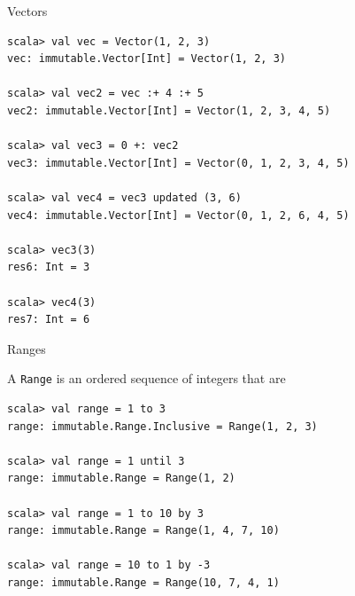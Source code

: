 \begin{frame}[fragile]{Vectors}
\begin{lstlisting}
scala> val vec = Vector(1, 2, 3)
vec: immutable.Vector[Int] = Vector(1, 2, 3)

scala> val vec2 = vec :+ 4 :+ 5
vec2: immutable.Vector[Int] = Vector(1, 2, 3, 4, 5)

scala> val vec3 = 0 +: vec2
vec3: immutable.Vector[Int] = Vector(0, 1, 2, 3, 4, 5)

scala> val vec4 = vec3 updated (3, 6)
vec4: immutable.Vector[Int] = Vector(0, 1, 2, 6, 4, 5)

scala> vec3(3)
res6: Int = 3

scala> vec4(3)
res7: Int = 6
\end{lstlisting}
\end{frame}

\begin{frame}[fragile]{Ranges}
\begin{center}
A \lstinline!Range! is an ordered sequence of integers that are 
\end{center}
\begin{lstlisting}
scala> val range = 1 to 3
range: immutable.Range.Inclusive = Range(1, 2, 3)

scala> val range = 1 until 3
range: immutable.Range = Range(1, 2)

scala> val range = 1 to 10 by 3
range: immutable.Range = Range(1, 4, 7, 10)

scala> val range = 10 to 1 by -3
range: immutable.Range = Range(10, 7, 4, 1)
\end{lstlisting}
\end{frame}

